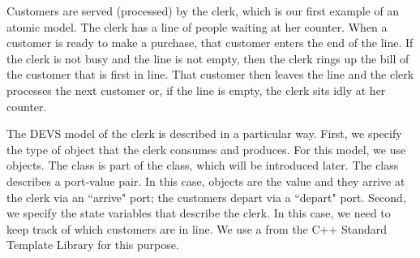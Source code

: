 Customers are served (processed) by the clerk, which is our first example of an atomic model. The clerk has a line of people waiting at her counter. When a customer is ready to make a purchase, that customer enters the end of the line. If the clerk is not busy and the line is not empty, then the clerk rings up the bill of the customer that is first in line. That customer then leaves the line and the clerk processes the next customer or, if the line is empty, the clerk sits idly at her counter.

The DEVS model of the clerk is described in a particular way. First, we specify the type of object that the clerk consumes and produces. For this model, we use  objects. The  class is part of the  class, which will be introduced later. The  class describes a port-value pair. In this case,  objects are the value and they arrive at the clerk via an ``arrive" port; the customers depart via a ``depart" port. Second, we specify the state variables that describe the clerk. In this case, we need to keep track of which customers are in line. We use a  from the C++ Standard Template Library for this purpose.

